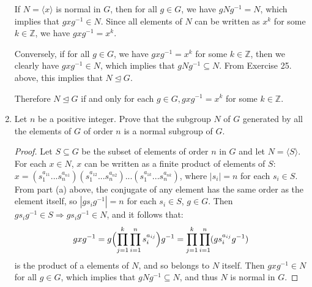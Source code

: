 \documentclass{article}
\begin{document}
\begin{enumerate}[label=(\alph*), itemsep=0em]
          If $N = \langle x \rangle$ is normal in $G$, then for all $g \in G$, we have $gNg^{-1} = N$, which implies that $gxg^{-1} \in N$. Since all elements of $N$ can be written as $x^k$ for some $k \in \mathbb{Z}$, we have $gxg^{-1} = x^k$.

          Conversely, if for all $g \in G$, we have $gxg^{-1} = x^k$ for some $k \in \mathbb{Z}$, then we clearly have $gxg^{-1} \in N$, which implies that $gNg^{-1} \subseteq N$. From Exercise 25. above, this implies that $N \unlhd G$.

          Therefore $N \unlhd G$ if and only for each $g \in G, gxg^{-1} = x^k$ for some $k \in \mathbb{Z}$.
    \item Let $n$ be a positive integer. Prove that the subgroup $N$ of $G$ generated by all the elements of $G$ of order $n$ is a normal subgroup of $G$.
          \begin{proof}
            Let $S \subseteq G$ be the subset of elements of order $n$ in $G$ and let $N = \langle S \rangle$. For each $x \in N$, $x$ can be written as a finite product of elements of $S$: $x = (s_1^{a_{11}}...s_n^{a_{n1}})(s_1^{a_{12}}...s_n^{a_{n2}})...(s_1^{a_{1k}}...s_n^{a_{nk}})$, where $|s_i| = n$ for each $s_i \in S$. From part (a) above, the conjugate of any element has the same order as the element itself, so $|gs_ig^{-1}| = n$ for each $s_i \in S$, $g \in G$. Then $gs_ig^{-1} \in S \Rightarrow gs_ig^{-1} \in N$, and it follows that:
            \begin{equation*}
                gxg^{-1} = g \Bigl( \prod_{j = 1}^{k} \prod_{i = 1}^{n} s_i^{a_{ij}} \Bigr) g^{-1} = \prod_{j = 1}^{k} \prod_{i = 1}^{n} (g s_i^{a_{ij}} g^{-1})
            \end{equation*}
            is the product of a elements of $N$, and so belongs to $N$ itself. Then $gxg^{-1} \in N$ for all $g \in G$, which implies that $gNg^{-1} \subseteq N$, and thus $N$ is normal in $G$.
          \end{proof}
\end{enumerate}
\end{document}
